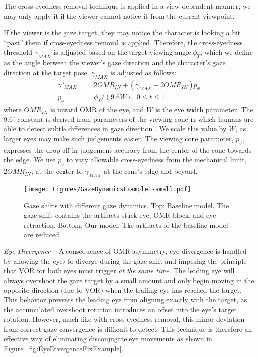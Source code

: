 The cross-eyedness removal technique is applied in a view-dependent manner; we may only apply it if the viewer cannot notice it from the current viewpoint.

If the viewer is the gaze target, they may notice the character is looking a bit ``past'' them if cross-eyedness removal is applied.
Therefore, the cross-eyedness threshold $\gamma_{MAX}$ is adjusted based on the target viewing angle $\phi_T$, which we define as the angle between the viewer's gaze direction and the character's gaze direction at the target pose. $\gamma_{MAX}$ is adjusted as follows:
\begin{eqnarray}
\gamma\,'_{MAX} &=& 2OMR_{IN} + ( \gamma_{MAX} - 2OMR_{IN} ) p_{\phi} \\
p_{\phi} &=& \phi_T / ( 9.6W ),~ 0 \le t \le 1 \nonumber
\end{eqnarray}
where $OMR_{IN}$ is inward OMR of the eye, and $W$ is the eye width parameter. The $9.6^{\circ}$ constant is derived from parameters of the viewing cone in which humans are able to detect subtle differences in gaze direction \cite{argyle1976gaze}. We scale this value by $W$, as larger eyes may make such judgements easier. The viewing cone parameter, $p_{\phi}$, expresses the drop-off in judgement accuracy from the center of the cone towards the edge. We use $p_{\phi}$ to vary allowable cross-eyedness from the mechanical limit, $2OMR_{IN}$, at the center to $\gamma_{MAX}$ at the cone's edge and beyond.

\begin{figure}[t]
\centering
\texttt{[image: Figures/GazeDynamicsExample1-small.pdf]}
\caption{Gaze shifts with different gaze dynamics. Top: Baseline model. The gaze shift contains the artifacts stuck eye, OMR-block, and eye retraction. Bottom: Our model. The artifacts of the baseline model are reduced.}
\vspace{-10pt}
\label{fig:GazeDynamicsExample}
\end{figure}

\textit{Eye Divergence} -- A consequence of OMR asymmetry, eye divergence is handled by allowing the eyes to diverge during the gaze shift and imposing the principle that VOR for both eyes must trigger \emph{at the same time}. The leading eye will always overshoot the gaze target by a small amount and only begin moving in the opposite direction (due to VOR) when the trailing eye has reached the target. This behavior prevents the leading eye from aligning exactly with the target, as the accumulated overshoot rotation introduces an offset into the eye's target rotation. However, much like with cross-eyedness removal, this minor deviation from correct gaze convergence is difficult to detect. This technique is therefore an effective way of eliminating disconjugate eye movements as shown in Figure~\ref{fig:EyeDivergenceFixExample}.

